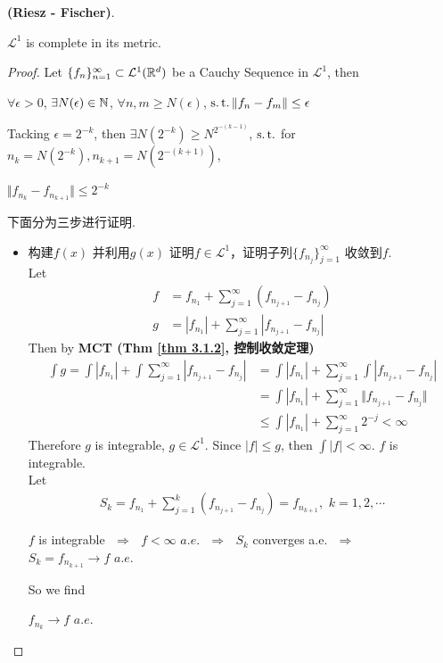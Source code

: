 	\begin{thm}\label{thm 3.2.1}
		\textbf{(Riesz - Fischer)}. 
		\begin{center}
			$\mathcal{L}^1$ is complete in its metric.
		\end{center}
	
		\vspace{2em}
		\begin{proof}
			Let $\{ f_n \}_{n = 1}^{\infty} \subset \mathcal{L}^{1}(\mathbb{R}^d)$ be a Cauchy Sequence in $\mathcal{L}^1$, then
			\begin{center}
				$\forall \epsilon > 0$, $\exists N(\epsilon) \in \mathbb{N}$, $\forall n , m \geq N(\epsilon)$, $\operatorname{s.t.} \Vert f_n - f_m \Vert \leq \epsilon$
			\end{center}
			Tacking $\epsilon = 2^{-k}$, then $\exists N(2^{-k}) \geq N^{2^{-(k - 1)}}$, $\operatorname{s.t.}$ for $n_k = N(2^{-k}) , n_{k + 1} = N(2^{-(k + 1)})$,
			\begin{center}
				$\Vert f_{n_k} - f_{n_{k + 1}} \Vert \leq 2^{-k}$
			\end{center}
			下面分为三步进行证明.
			\begin{itemize}
				\item 构建$f(x)$ 并利用$g(x)$ 证明$f \in \mathcal{L}^1$，证明子列$\{ f_{n_j} \}_{j = 1}^{\infty}$ 收敛到$f$. \\
				Let 
				\begin{align}
					f &= f_{n_1} + \sum_{j = 1}^{\infty}{(f_{n_{j + 1}} - f_{n_j})} \\
					g &= \left| f_{n_1} \right| + \sum_{j = 1}^{\infty}{\left| f_{n_{j + 1}} - f_{n_j} \right|}
				\end{align}
				Then by \textbf{MCT (Thm \ref{thm 3.1.2}, 控制收敛定理)}
				\begin{align}
					\int{g}
					= \int{\left| f_{n_1} \right|} + \int{\sum_{j = 1}^{\infty}{\left| f_{n_{j + 1}} - f_{n_j} \right|}}
					&= \int{\left| f_{n_1} \right|} + \sum_{j = 1}^{\infty}{\int{\left| f_{n_{j + 1}} - f_{n_j} \right|}} \\
					&= \int{\left| f_{n_1} \right|} + \sum_{j = 1}^{\infty}{\Vert f_{n_{j + 1}} - f_{n_j} \Vert} \\
					&\leq \int{\left| f_{n_1} \right|} + \sum_{j = 1}^{\infty}{2^{-j}}
					< \infty
				\end{align}
				Therefore $g$ is integrable, $g \in \mathcal{L}^1$. Since $\left| f \right| \leq g$, then $\int{\left| f \right|} < \infty$. $f$ is integrable. \\
				Let
				\begin{align}
					S_{k} = f_{n_1} + \sum_{j = 1}^{k}{(f_{n_{j + 1}} - f_{n_j})} = f_{n_{k + 1}} , \,\, k = 1 , 2 , \cdots
				\end{align}
				\begin{center}
					$f$ is integrable $\,\, \Rightarrow \,\,$ $f < \infty \,\, a.e.$ $\,\, \Rightarrow \,\,$ $S_k$ converges a.e. $\,\, \Rightarrow \,\,$ $S_k = f_{n_{k + 1}} \to f \,\, a.e.$
				\end{center}
				So we find
				\begin{center}
					$f_{n_k} \to f \,\, a.e.$
				\end{center}
				

\end{itemize}
\end{proof}
\end{thm}
